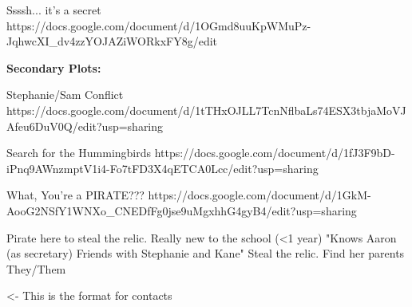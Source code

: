 \documentclass[char]{GL2020}
\begin{document}
Ssssh... it's a secret  https://docs.google.com/document/d/1OGmd8uuKpWMuPz-JqhwcXI_dv4zzYOJAZiWORkxFY8g/edit

\textbf{Secondary Plots:}

Stephanie/Sam Conflict  https://docs.google.com/document/d/1tTHxOJLL7TcnNflbaLs74ESX3tbjaMoVJAfeu6DuV0Q/edit?usp=sharing

Search for the Hummingbirds https://docs.google.com/document/d/1fJ3F9bD-iPnq9AWnzmptV1i4-Fo7tFD3X4qETCA0Lcc/edit?usp=sharing

What, You're a PIRATE??? https://docs.google.com/document/d/1GkM-AooG2NSfY1WNXo_CNEDfFg0jse9uMgxhhG4gyB4/edit?usp=sharing

Pirate here to steal the relic. Really new to the school (<1 year)	"Knows Aaron (as secretary)
Friends with Stephanie and Kane"	Steal the relic. Find her parents		They/Them

\begin{itemz}[Goals]
	\item 
\end{itemz}

\begin{itemz}[Notes]
	\item 
\end{itemz}

\begin{contacts}
	\contact{\cTest{}} <- This is the format for contacts 
\end{contacts}
\end{document}
